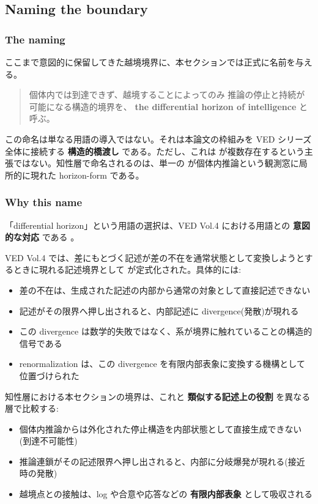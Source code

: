 \subsection{Naming the boundary}


\subsubsection{The naming}


ここまで意図的に保留してきた越境境界に、本セクションでは正式に名前を与える。

\begin{quote}
個体内では到達できず、越境することによってのみ
推論の停止と持続が可能になる構造的境界を、
\textbf{the differential horizon of intelligence} と呼ぶ。
\end{quote}

この命名は単なる用語の導入ではない。それは本論文の枠組みを VED シリーズ全体に接続する \textbf{構造的橋渡し} である。ただし、これは \DH{} が複数存在するという主張ではない。知性層で命名されるのは、単一の \DH{} が個体内推論という観測窓に局所的に現れた horizon-form である。

\subsubsection{Why this name}


「differential horizon」という用語の選択は、VED Vol.4 における用語との \textbf{意図的な対応} である \citep{VEDVol4}。

VED Vol.4 では、差にもとづく記述が差の不在を通常状態として変換しようとするときに現れる記述境界として \DH{} が定式化された。具体的には:

\begin{itemize}
\item 差の不在は、生成された記述の内部から通常の対象として直接記述できない
\item 記述がその限界へ押し出されると、内部記述に divergence(発散)が現れる
\item この divergence は数学的失敗ではなく、系が境界に触れていることの構造的信号である
\item renormalization は、この divergence を有限内部表象に変換する機構として位置づけられた
\end{itemize}

知性層における本セクションの境界は、これと \textbf{類似する記述上の役割} を異なる層で比較する:

\begin{itemize}
\item 個体内推論からは外化された停止構造を内部状態として直接生成できない(到達不可能性)
\item 推論連鎖がその記述限界へ押し出されると、内部に分岐爆発が現れる(接近時の発散)
\item 越境点との接触は、log や合意や応答などの \textbf{有限内部表象} として吸収される
\end{itemize}

